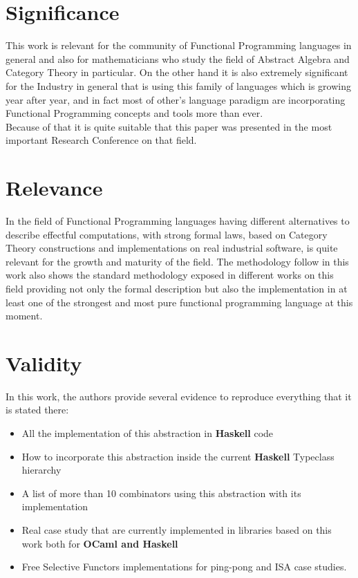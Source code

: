 \documentclass[12pt, a4paper]{article}
\begin{document}
\section{Significance}
This work is relevant for the community of Functional Programming languages in
general and also for mathematicians who study the field of Abstract Algebra and
Category Theory in particular. On the other hand it is also extremely
significant for the Industry in general that is using this family of languages
which is growing year after year, and in fact most of other's language paradigm
are incorporating Functional Programming concepts and tools more than ever.\\
Because of that it is quite suitable that this paper was presented in the most
important Research Conference on that field.


\section{Relevance}
In the field of Functional Programming languages having different alternatives
to describe effectful computations, with strong formal laws, based on Category
Theory constructions and implementations on real industrial software, is quite
relevant for the growth and maturity of the field. The methodology follow in
this work also shows the standard methodology exposed in different works on this
field providing not only the formal description but also the implementation in
at least one of the strongest and most pure functional programming language at
this moment.

\section{Validity}\label{validity}
In this work, the authors provide several evidence to reproduce everything that
it is stated there:

\begin{itemize}
  \item All the implementation of this abstraction in \textbf{Haskell} code
  \item How to incorporate this abstraction inside the current \textbf{Haskell}
    Typeclass hierarchy
  \item A list of more than 10 combinators using this abstraction with its
    implementation
  \item Real case study that are currently implemented in libraries based on
    this work both for \textbf{OCaml and Haskell}
  \item Free Selective Functors implementations for ping-pong and ISA case studies.
\end{itemize}
\end{document}
